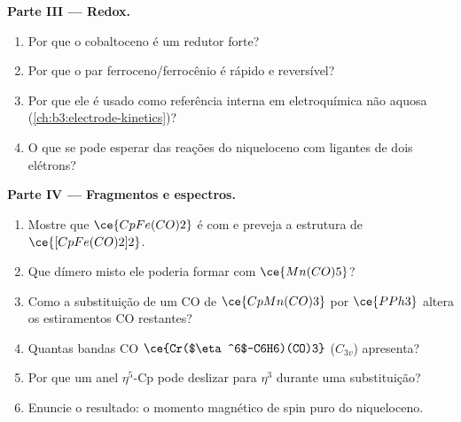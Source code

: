 \begin{problem}
\medskip\noindent\textbf{Parte III --- Redox.}
\begin{enumerate}[resume]
  \item Por que o cobaltoceno é um redutor forte?
  \item Por que o par ferroceno/ferrocênio é rápido e reversível?
  \item Por que ele é usado como referência interna em eletroquímica não aquosa
        (\cref{ch:b3:electrode-kinetics})?
  \item O que se pode esperar das reações do niqueloceno com ligantes de dois
        elétrons?
\end{enumerate}

\medskip\noindent\textbf{Parte IV --- Fragmentos e espectros.}
\begin{enumerate}[resume]
  \item Mostre que $\ce{CpFe(CO)2}$ é  com  e preveja a estrutura de
        $\ce{[CpFe(CO)2]2}$.
  \item Que dímero misto ele poderia formar com $\ce{Mn(CO)5}$?
  \item Como a substituição de um CO de $\ce{CpMn(CO)3}$ por $\ce{PPh3}$ altera os estiramentos CO
        restantes?
  \item Quantas bandas CO $\ce{Cr($\eta^6$-C6H6)(CO)3}$ ($C_{3v}$) apresenta?
  \item Por que um anel $\eta^5$-Cp pode deslizar para $\eta^3$ durante uma substituição?
  \item Enuncie o resultado: o momento magnético de spin puro do niqueloceno.
\end{enumerate}
\end{problem}
